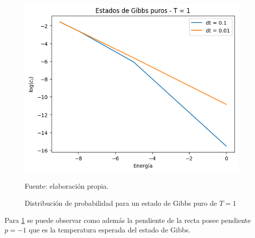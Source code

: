 \newpage

\begin{figure}[!h]
    \centering
    \includegraphics[scale = 0.7]{plt/a06-gibbs_state_pb.png}
    \caption{Distribución de probabilidad para un estado de Gibbs puro de $T=1$}
    Fuente: elaboración propia.
    \label{fig:result_gibbs_pb}
\end{figure}

Para \ref{fig:result_gibbs_pb} se puede observar como además la pendiente de la recta posee pendiente $p=-1$ que es la temperatura esperada del estado de Gibbs.